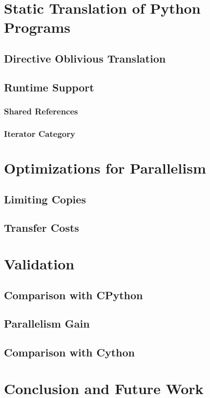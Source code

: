 \documentclass{llncs}
\begin{document}
\section{Static Translation of Python Programs}\label{sec:python-static}

\subsection{Directive Oblivious Translation}

\subsection{Runtime Support}

\subsubsection{Shared References}

\subsubsection{Iterator Category}

\section{Optimizations for Parallelism}\label{sec:python-optim}

\subsection{Limiting Copies}

\subsection{Transfer Costs}

\section{Validation}\label{sec:validation}

\subsection{Comparison with CPython}

\subsection{Parallelism Gain}

\subsection{Comparison with Cython}

\section{Conclusion and Future Work}



\end{document}

